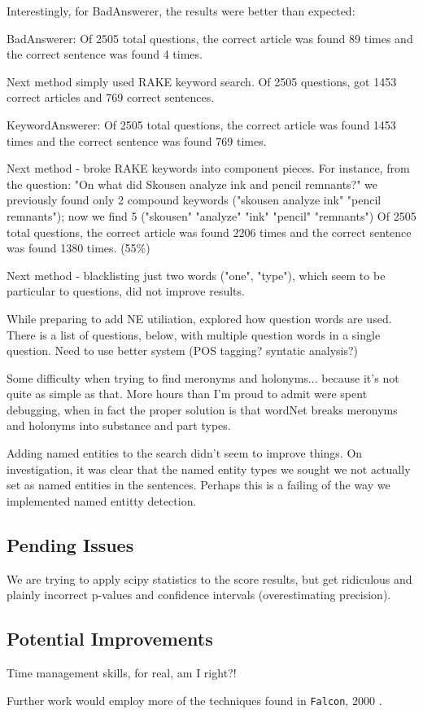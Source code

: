 \documentclass[11pt]{article}
\begin{document}
Interestingly, for BadAnswerer, the results were better than expected:

BadAnswerer: Of 2505 total questions, the correct article was found 89 times and the correct sentence was found 4 times.

Next method simply used RAKE keyword search. Of 2505 questions, got 1453 correct articles and 769 correct sentences.

KeywordAnswerer: Of 2505 total questions, the correct article was found 1453 times and the correct sentence was found 769 times.

Next method - broke RAKE keywords into component pieces. For instance, from the question: "On what did Skousen analyze ink and pencil remnants?" we previously found only 2 compound keywords ("skousen analyze ink" "pencil remnants"); now we find 5 ("skousen" "analyze" "ink" "pencil" "remnants")
Of 2505 total questions, the correct article was found 2206 times and the correct sentence was found 1380 times. (55\%)

Next method - blacklisting just two words ("one", "type"), which seem to be particular to questions, did not improve results.

While preparing to add NE utiliation, explored how question words are used. There is a list of questions, below, with multiple question words in a single question. Need to use better system (POS tagging? syntatic analysis?)

Some difficulty when trying to find meronyms and holonyms... because it's not quite as simple as that. More hours than I'm proud to admit were spent debugging, when in fact the proper solution is that wordNet breaks meronyms and holonyms into substance and part types.

Adding named entities to the search didn't seem to improve things. On investigation, it was clear that the named entity types we sought we not actually set as named entities in the sentences. Perhaps this is a failing of the way we implemented named entitty detection.

\subsection{Pending Issues}

We are trying to apply scipy statistics to the score results, but get ridiculous and plainly incorrect p-values and confidence intervals (overestimating precision).

\subsection{Potential Improvements}

Time management skills, for real, am I right?!

Further work would employ more of the techniques found in \texttt{Falcon}, 2000 \cite{falcon2000}.

{}

\end{document}
